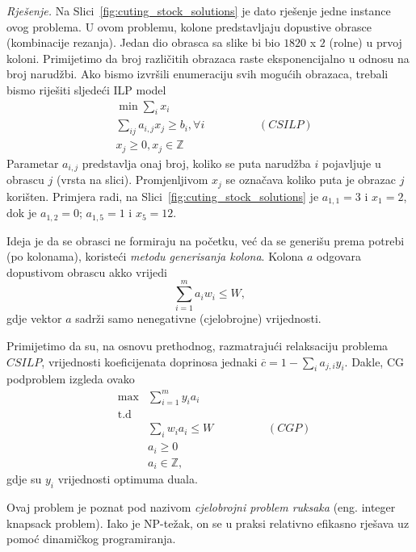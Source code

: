 \documentclass[a4paper, utf8, 11pt, colorlinks]{book}
\theoremstyle{definition}
\begin{document}
 \emph{Rješenje.} Na Slici~\ref{fig:cuting_stock_solutions} je dato rješenje jedne instance ovog problema. 
 U ovom problemu, kolone predstavljaju dopustive obrasce (kombinacije rezanja). Jedan dio obrasca sa slike bi bio $1820$ x $2$ (rolne) u prvoj koloni.
 Primijetimo da broj različitih obrazaca raste eksponencijalno u odnosu na broj narudžbi.  Ako bismo izvršili enumeraciju svih mogućih obrazaca, trebali bismo riješiti sljedeći ILP model
 \begin{align*}
      & \min \sum_{i} x_i \\
      & \sum_{ij} a_{i,j }x_j \geq b_i, \forall i \hspace{2cm} (CSILP)\\
      &  x_j \geq 0, x_{j} \in \mathbb{Z} 
 \end{align*}
 Parametar $a_{i,j}$ predstavlja onaj broj, koliko se puta  narudžba $i$ pojavljuje u obrascu $j$ (vrsta na slici). Promjenljivom $x_j$ se označava koliko puta je obrazac $j$ korišten. Primjera radi, na  Slici~\ref{fig:cuting_stock_solutions} je $a_{1,1}=3$ i $x_1 = 2$, dok je $a_{1,2}=0$; $a_{1,5}=1$ i $ x_5 = 12$.
 
 Ideja je da se obrasci ne formiraju na početku, već da se generišu prema potrebi (po kolonama), koristeći \emph{metodu generisanja kolona}. Kolona $a$ odgovara dopustivom obrascu akko vrijedi 
 $$ \sum_{i=1}^m a_i w_i \leq W,$$
 gdje vektor $a$ sadrži samo nenegativne (cjelobrojne) vrijednosti. 
 
Primijetimo da su, na osnovu prethodnog, razmatrajući relaksaciju problema  $CSILP$, vrijednosti koeficijenata doprinosa 
jednaki $\overline{c} = 1 - \sum_{i} a_{j,i} y_i$.  
 Dakle, CG podproblem izgleda ovako
$$ \begin{array}{lll}
     &\max& \sum_{i=1}^m y_i a_i \\
     & \mbox{t.d}& \\
     &  &\sum_{i} w_i a_i \leq W \hspace{2cm} (CGP)\\
     & &a_i \geq 0 \\
     & &a_i \in \mathbb{Z},
 \end{array}$$
  gdje su $y_i$ vrijednosti optimuma duala. 
  
 
 Ovaj problem je poznat pod nazivom \emph{cjelobrojni problem ruksaka} (eng. integer knapsack problem). Iako je NP-težak, on se u praksi relativno efikasno rješava  uz pomoć dinamičkog programiranja. 
 
\end{document}

